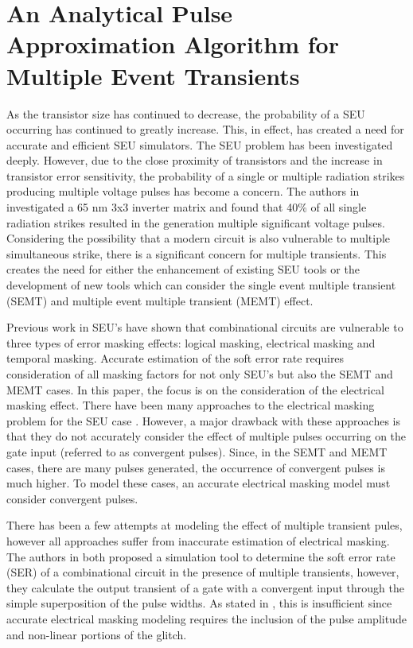
\chapter{An Analytical Pulse Approximation Algorithm for Multiple Event Transients} \label{ch2}

As the transistor size has continued to decrease, the probability of a SEU occurring has continued to greatly increase. This, in effect, has created a need for accurate and efficient SEU simulators. The SEU problem has been investigated deeply. \cite{MARS_C,SERA,FASER} However, due to the close proximity of transistors and the increase in transistor error sensitivity, the probability of a single or multiple radiation strikes producing multiple voltage pulses has become a concern. The authors in \cite{Harada} investigated a 65 nm 3x3 inverter matrix and found that 40\% of all single radiation strikes resulted in the generation multiple significant voltage pulses. Considering the possibility that a modern circuit is also vulnerable to multiple simultaneous strike, there is a significant concern for multiple transients. This creates the need for either the enhancement of existing SEU tools or the development of new tools which can consider the single event multiple transient (SEMT) and multiple event multiple transient (MEMT) effect.

Previous work in SEU’s have shown that combinational circuits are vulnerable to three types of error masking effects: logical masking, electrical masking and temporal masking. Accurate estimation of the soft error rate requires consideration of all masking factors for not only SEU’s but also the SEMT and MEMT cases. In this paper, the focus is on the consideration of the electrical masking effect. There have been many approaches to the electrical masking problem for the SEU case \cite{Omana_Trap,Accurate_Masking,Weibull}. However, a major drawback with these approaches is that they do not accurately consider the effect of multiple pulses occurring on the gate input (referred to as convergent pulses). Since, in the SEMT and MEMT cases, there are many pulses generated, the occurrence of convergent pulses is much higher. To model these cases, an accurate electrical masking model must consider convergent pulses. 

There has been a few attempts at modeling the effect of multiple transient pules, however all approaches suffer from inaccurate estimation of electrical masking. The authors in \cite{METSys,TahooriMET} both proposed a simulation tool to determine the soft error rate (SER) of a combinational circuit in the presence of multiple transients, however, they calculate the output transient of a gate with a convergent input through the simple superposition of the pulse widths. As stated in \cite{Accurate_Masking}, this is insufficient since accurate electrical masking modeling requires the inclusion of the pulse amplitude and non-linear portions of the glitch.

